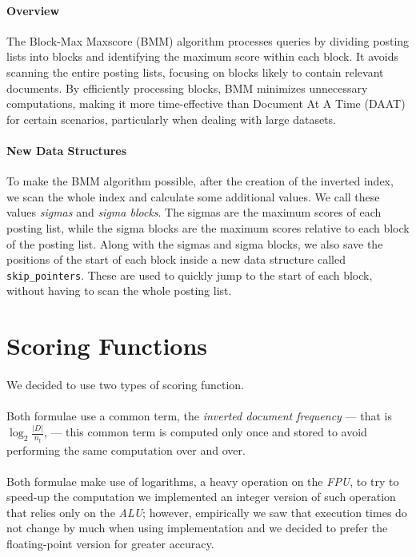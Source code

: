 \paragraph{Overview}
The Block-Max Maxscore (BMM) algorithm processes queries by dividing posting lists into blocks and identifying the maximum score 
within each block. It avoids scanning the entire posting lists, focusing on blocks likely to contain relevant documents. 
By efficiently processing blocks, BMM minimizes unnecessary computations, making it more time-effective than 
Document At A Time (DAAT) for certain scenarios, particularly when dealing with large datasets.

\paragraph{New Data Structures}
To make the BMM algorithm possible, after the creation of the inverted index, we scan the whole index and calculate some additional values.
We call these values \textit{sigmas} and \textit{sigma blocks}. The sigmas are the maximum scores of each posting list, 
while the sigma blocks are the maximum scores relative to each block of the posting list.
Along with the sigmas and sigma blocks, we also save the positions of the start of each block inside a new data structure called \texttt{skip\_pointers}.
These are used to quickly jump to the start of each block, without having to scan the whole posting list. 

\section{Scoring Functions}

\paragraph{}
We decided to use two types of scoring function.

\paragraph{}
Both formulae use a common term, the \textit{inverted document frequency} --- that is $\log_2\frac{|D|}{n_t}$, --- this common term is computed only once and stored to avoid performing the same computation over and over.

\paragraph{}
Both formulae make use of logarithms, a heavy operation on the \textit{FPU}, to try to speed-up the computation we implemented an integer version of such operation that relies only on the \textit{ALU}; however, empirically we saw that execution times do not change by much when using implementation and we decided to prefer the floating-point version for greater accuracy. 

